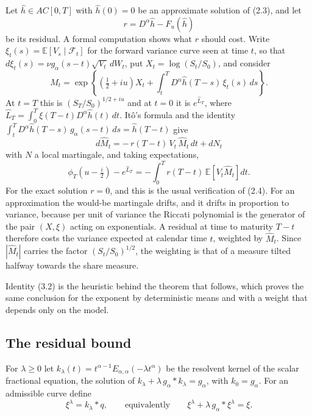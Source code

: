 \documentclass[11pt,a4paper]{article}
\begin{document}
Let \(\widehat h\in AC[0,T]\) with \(\widehat h(0)=0\) be an approximate solution of (2.3), and let
\begin{equation*}\tag{3.1}
r=D^\alpha\widehat h-F_u(\widehat h)
\end{equation*}
be its residual. A formal computation shows what \(r\) should cost. Write \(\xi_t(s)=\mathbb E[V_s\mid\mathcal F_t]\) for the forward variance curve seen at time \(t\), so that \(d\xi_t(s)=\nu g_\alpha(s-t)\sqrt{V_t}\,dW_t\), put \(X_t=\log(S_t/S_0)\), and consider
\[
\widehat M_t=\exp\left\{\left(\tfrac12+iu\right)X_t+\int_t^TD^\alpha\widehat h(T-s)\,\xi_t(s)\,ds\right\}.
\]
At \(t=T\) this is \((S_T/S_0)^{1/2+iu}\) and at \(t=0\) it is \(e^{\widehat L_T}\), where \(\widehat L_T=\int_0^T\xi(T-t)D^\alpha\widehat h(t)\,dt\). Itô's formula and the identity \(\int_t^TD^\alpha\widehat h(T-s)\,g_\alpha(s-t)\,ds=\widehat h(T-t)\) give
\[
d\widehat M_t=-\,r(T-t)\,V_t\,\widehat M_t\,dt+dN_t
\]
with \(N\) a local martingale, and taking expectations,
\begin{equation*}\tag{3.2}
\phi_T(u-\tfrac i2)-e^{\widehat L_T}=-\int_0^Tr(T-t)\,\mathbb E\left[V_t\widehat M_t\right]dt .
\end{equation*}
For the exact solution \(r=0\), and this is the usual verification of (2.4). For an approximation the would-be martingale drifts, and it drifts in proportion to variance, because per unit of variance the Riccati polynomial is the generator of the pair \((X,\xi)\) acting on exponentials. A residual at time to maturity \(T-t\) therefore costs the variance expected at calendar time \(t\), weighted by \(\widehat M_t\). Since \(|\widehat M_t|\) carries the factor \((S_t/S_0)^{1/2}\), the weighting is that of a measure tilted halfway towards the share measure.

Identity (3.2) is the heuristic behind the theorem that follows, which proves the same conclusion for the exponent by deterministic means and with a weight that depends only on the model.

\setcounter{subsection}{1}\subsection{The residual bound}

For \(\lambda\ge0\) let \(k_\lambda(t)=t^{\alpha-1}E_{\alpha,\alpha}(-\lambda t^\alpha)\) be the resolvent kernel of the scalar fractional equation, the solution of \(k_\lambda+\lambda\,g_\alpha*k_\lambda=g_\alpha\), with \(k_0=g_\alpha\). For an admissible curve define
\begin{equation*}\tag{3.3}
\xi^\lambda=k_\lambda*q,\qquad\text{equivalently}\qquad\xi^\lambda+\lambda\,g_\alpha*\xi^\lambda=\xi .
\end{equation*}
\end{document}
